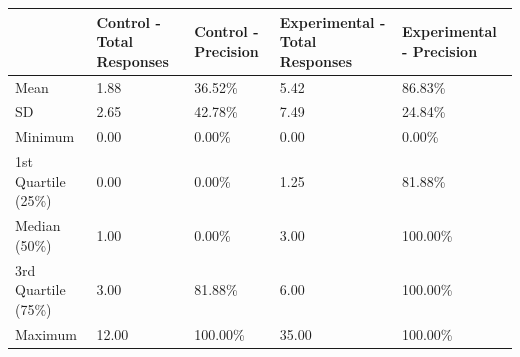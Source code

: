 \begin{tabular}{lllll}
\toprule
 & Control - Total Responses & Control - Precision & Experimental - Total Responses & Experimental - Precision \\
\midrule
Mean & 1.88 & 36.52\% & 5.42 & 86.83\% \\
SD & 2.65 & 42.78\% & 7.49 & 24.84\% \\
Minimum & 0.00 & 0.00\% & 0.00 & 0.00\% \\
1st Quartile (25\%) & 0.00 & 0.00\% & 1.25 & 81.88\% \\
Median (50\%) & 1.00 & 0.00\% & 3.00 & 100.00\% \\
3rd Quartile (75\%) & 3.00 & 81.88\% & 6.00 & 100.00\% \\
Maximum & 12.00 & 100.00\% & 35.00 & 100.00\% \\
\bottomrule
\end{tabular}
